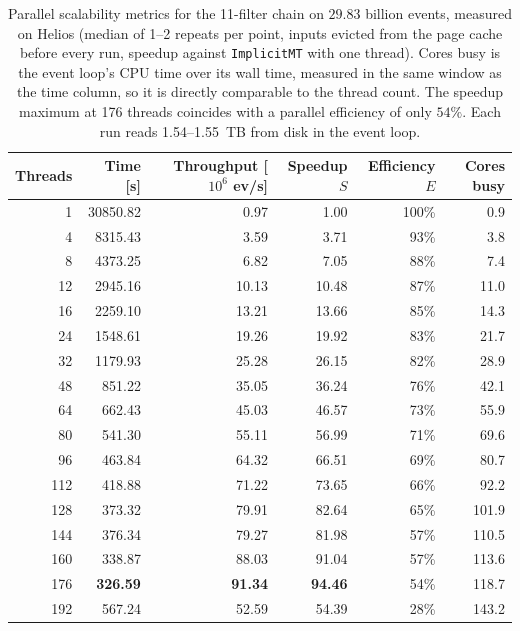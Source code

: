 \begin{table}[htbp]
\centering
\caption{Parallel scalability metrics for the 11-filter chain on $29.83$ billion events, measured on Helios (median of 1--2 repeats per point, inputs evicted from the page cache before every run, speedup against \texttt{ImplicitMT} with one thread). Cores busy is the event loop's CPU time over its wall time, measured in the same window as the time column, so it is directly comparable to the thread count. The speedup maximum at 176 threads coincides with a parallel efficiency of only $54\%$. Each run reads 1.54--1.55~TB from disk in the event loop.}
\label{tab:scalability-chain11}
\begin{tabular}{rrrrrr}
\toprule
Threads & Time [s] & Throughput [$10^6$ ev/s] & Speedup $S$ & Efficiency $E$ & Cores busy \\
\midrule
 1 & 30850.82 & 0.97 & 1.00 & 100\% & 0.9 \\
 4 & 8315.43 & 3.59 & 3.71 & 93\% & 3.8 \\
 8 & 4373.25 & 6.82 & 7.05 & 88\% & 7.4 \\
12 & 2945.16 & 10.13 & 10.48 & 87\% & 11.0 \\
16 & 2259.10 & 13.21 & 13.66 & 85\% & 14.3 \\
24 & 1548.61 & 19.26 & 19.92 & 83\% & 21.7 \\
32 & 1179.93 & 25.28 & 26.15 & 82\% & 28.9 \\
48 & 851.22 & 35.05 & 36.24 & 76\% & 42.1 \\
64 & 662.43 & 45.03 & 46.57 & 73\% & 55.9 \\
80 & 541.30 & 55.11 & 56.99 & 71\% & 69.6 \\
96 & 463.84 & 64.32 & 66.51 & 69\% & 80.7 \\
112 & 418.88 & 71.22 & 73.65 & 66\% & 92.2 \\
128 & 373.32 & 79.91 & 82.64 & 65\% & 101.9 \\
144 & 376.34 & 79.27 & 81.98 & 57\% & 110.5 \\
160 & 338.87 & 88.03 & 91.04 & 57\% & 113.6 \\
176 & \textbf{326.59} & \textbf{91.34} & \textbf{94.46} & 54\% & 118.7 \\
192 & 567.24 & 52.59 & 54.39 & 28\% & 143.2 \\
\bottomrule
\end{tabular}
\end{table}
